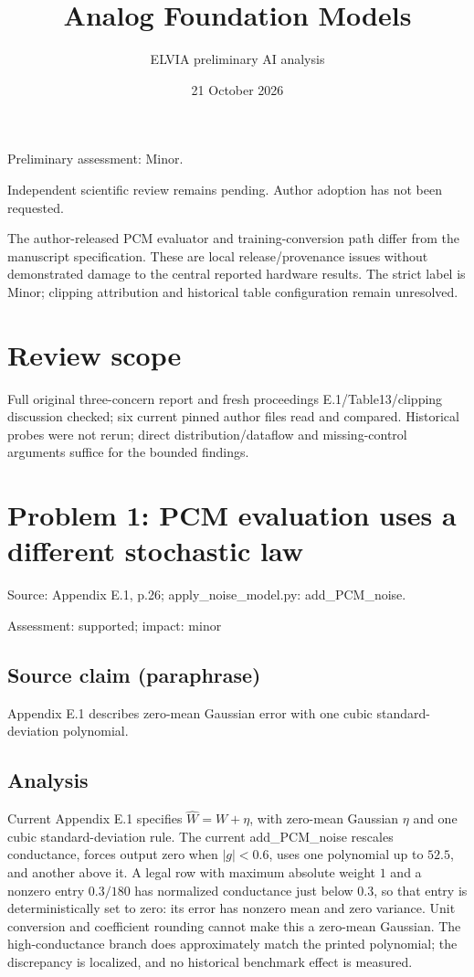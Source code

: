 \documentclass[11pt]{article}
\begin{document}
\title{Analog Foundation Models}

\author{ELVIA preliminary AI analysis}\date{21 October 2026}\maketitle

Preliminary assessment: Minor.\par

Independent scientific review remains pending. Author adoption has not been requested.

The author-released PCM evaluator and training-conversion path differ from the manuscript specification. These are local release/provenance issues without demonstrated damage to the central reported hardware results. The strict label is Minor; clipping attribution and historical table configuration remain unresolved.

\section*{Review scope}

Full original three-concern report and fresh proceedings E.1/Table13/clipping discussion checked; six current pinned author files read and compared. Historical probes were not rerun; direct distribution/dataflow and missing-control arguments suffice for the bounded findings.

\section*{Problem 1: PCM evaluation uses a different stochastic law}

Source: Appendix E.1, p.26; apply\_noise\_model.py: add\_PCM\_noise.

Assessment: supported; impact: minor

\subsection*{Source claim (paraphrase)}

Appendix E.1 describes zero-mean Gaussian error with one cubic standard-deviation polynomial.

\subsection*{Analysis}

Current Appendix E.1 specifies \(\widehat W=W+\eta\), with zero-mean Gaussian \(\eta\) and one cubic standard-deviation rule. The current add\_PCM\_noise rescales conductance, forces output zero when \(|g|<0.6\), uses one polynomial up to \(52.5\), and another above it. A legal row with maximum absolute weight \(1\) and a nonzero entry \(0.3/180\) has normalized conductance just below \(0.3\), so that entry is deterministically set to zero: its error has nonzero mean and zero variance. Unit conversion and coefficient rounding cannot make this a zero-mean Gaussian. The high-conductance branch does approximately match the printed polynomial; the discrepancy is localized, and no historical benchmark effect is measured.
\end{document}

